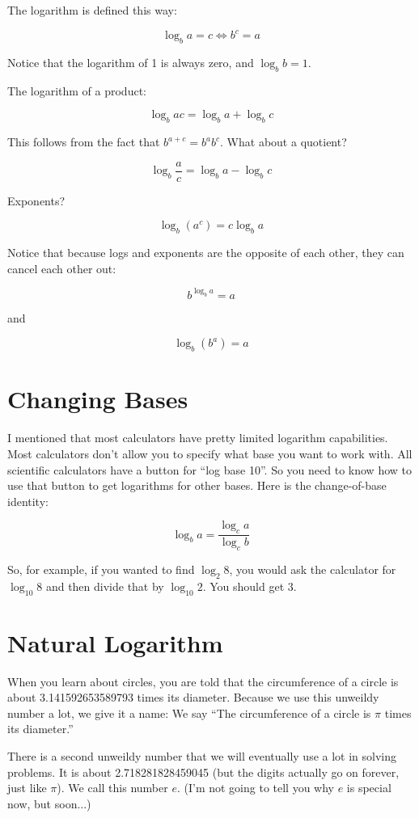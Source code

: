 The logarithm is defined this way:

$$\log_b a = c \iff b^c = a$$

Notice that the logarithm of 1 is always zero, and $\log_b b = 1$.

The logarithm of a product:

$$\log_b a c = \log_b a + \log_b c$$

This follows from the fact that $b^{a + c} = b^a b^c$. What about a quotient?

$$\log_b \frac{a}{c} = \log_b a - \log_b c$$

Exponents?

$$\log_b \left(a^c\right) = c \log_b a$$

Notice that because logs and exponents are the opposite of each other, they can cancel each other out:

$$b^{\log_b a} = a$$

and

$$\log_b \left(b^a\right) = a$$

\section{Changing Bases}

I mentioned that most calculators have pretty limited logarithm
capabilities. Most calculators don't allow you to specify what base
you want to work with. All scientific calculators have a button for
``log base 10''.  So you need to know how to use that button to get
logarithms for other bases.  Here is the change-of-base identity:

$$\log_b a = \frac {\log_c a}{\log_c b}$$

So, for example, if you wanted to find $\log_2 8$, you would ask the
calculator for $\log_{10} 8$ and then divide that by $\log_{10} 2$.
You should get 3.

\section{Natural Logarithm}

When you learn about circles, you are told that the circumference of a
circle is about 3.141592653589793 times its diameter.  Because we use
this unweildy number a lot, we give it a name: We say ``The
circumference of a circle is $\pi$ times its diameter.''

There is a second unweildy number that we will eventually use a lot in
solving problems.  It is about 2.718281828459045 (but the digits
actually go on forever, just like $\pi$). We call this number $e$. (I'm
not going to tell you why $e$ is special now, but soon...)

